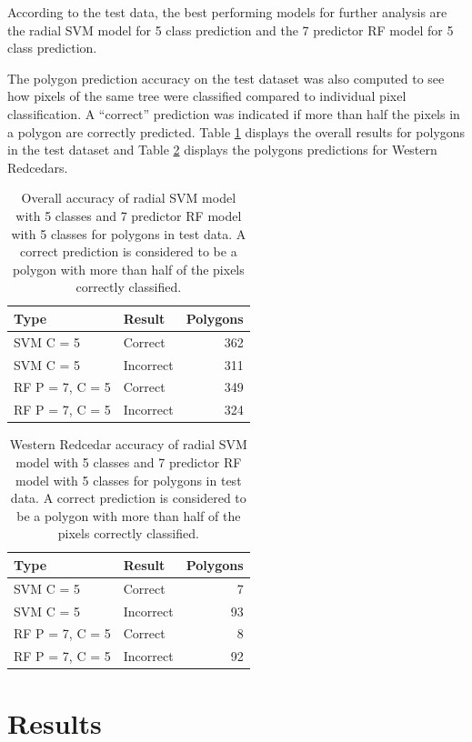 \documentclass[12pt,twoside]{reedthesis}
\begin{document}
According to the test data, the best performing models for further analysis are the radial SVM model for 5 class prediction and the 7 predictor RF model for 5 class prediction.

The polygon prediction accuracy on the test dataset was also computed to see how pixels of the same tree were classified compared to individual pixel classification. A ``correct'' prediction was indicated if more than half the pixels in a polygon are correctly predicted. Table \ref{tab:polyTab} displays the overall results for polygons in the test dataset and Table \ref{tab:polyTabRed} displays the polygons predictions for Western Redcedars.
\begin{table}

\caption{\label{tab:polyTab}Overall accuracy of radial SVM model with 5 classes and 7 predictor RF model with 5 classes for polygons in test data. A correct prediction is considered to be a polygon with more than half of the pixels correctly classified.}
\centering
\begin{tabular}[t]{l|l|r}
\hline
Type & Result & Polygons\\
\hline
SVM C = 5 & Correct & 362\\
\hline
SVM C = 5 & Incorrect & 311\\
\hline
RF P = 7, C = 5 & Correct & 349\\
\hline
RF P = 7, C = 5 & Incorrect & 324\\
\hline
\end{tabular}
\end{table}
\begin{table}

\caption{\label{tab:polyTabRed}Western Redcedar accuracy of radial SVM model with 5 classes and 7 predictor RF model with 5 classes for polygons in test data. A correct prediction is considered to be a polygon with more than half of the pixels correctly classified.}
\centering
\begin{tabular}[t]{l|l|r}
\hline
Type & Result & Polygons\\
\hline
SVM C = 5 & Correct & 7\\
\hline
SVM C = 5 & Incorrect & 93\\
\hline
RF P = 7, C = 5 & Correct & 8\\
\hline
RF P = 7, C = 5 & Incorrect & 92\\
\hline
\end{tabular}
\end{table}
\hypertarget{results}{%
\chapter{Results}\label{results}}
\end{document}
